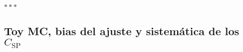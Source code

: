
\bigskip

\begin{center}
	$***$
\end{center}

\medskip


\begin{subappendices}





\section{Toy MC, bias del ajuste y sistemática de los $C_{\text{SP}}$}






\end{subappendices}
